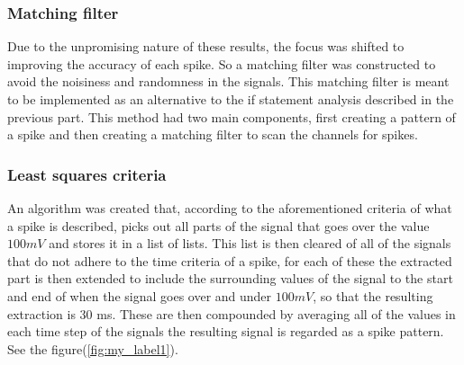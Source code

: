 


 





\subsubsection{Matching filter}
Due to the unpromising nature of these results, the focus was shifted to improving the accuracy of each spike. So a matching filter was constructed to avoid the noisiness and randomness in the signals. This matching filter is meant to be implemented as an alternative to the if statement analysis described in the previous part. This method had two main components, first creating a pattern of a spike and then creating a matching filter to scan the channels for spikes.\\


\subsubsection{Least squares criteria}
An algorithm was created that, according to the aforementioned criteria of what a spike is described, picks out all parts of the signal that goes over the value $100 mV$ and stores it in a list of lists. This list is then cleared of all of the signals that do not adhere to the time criteria of a spike, for each of these the extracted part is then extended to include the surrounding values of the signal to the start and end of when the signal goes over and under $100mV$, so that the resulting extraction is 30 ms. These are then compounded by averaging all of the values in each time step of the signals the resulting signal is regarded as a spike pattern. See the figure(\ref{fig:my_label1}).\\

